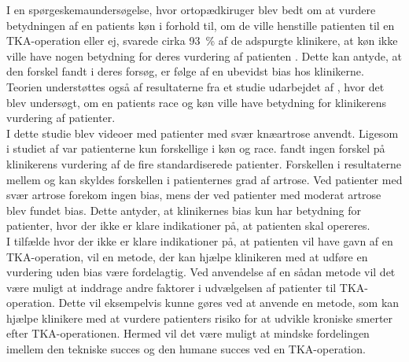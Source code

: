 I en spørgeskemaundersøgelse, hvor ortopædkiruger blev bedt om at vurdere betydningen af en patients køn i forhold til, om de ville henstille patienten til en TKA-operation eller ej, svarede cirka 93~\% af de adspurgte klinikere, at køn ikke ville have nogen betydning for deres vurdering af patienten \citep{wright1995}. Dette kan antyde, at den forskel  fandt i deres forsøg, er følge af en ubevidst bias hos klinikerne. Teorien understøttes også af resultaterne fra et studie udarbejdet af , hvor det blev undersøgt, om en patients race og køn ville have betydning for klinikerens vurdering af patienter.\\
I dette studie blev videoer med patienter med svær knæartrose anvendt. Ligesom i studiet af  var patienterne kun forskellige i køn og race.  fandt ingen forskel på klinikerens vurdering af de fire standardiserede patienter. Forskellen i resultaterne mellem  og  kan skyldes forskellen i patienternes grad af artrose. Ved patienter med svær artrose forekom ingen bias, mens der ved patienter med moderat artrose blev fundet bias. Dette antyder, at klinikernes bias kun har betydning for patienter, hvor der ikke er klare indikationer på, at patienten skal opereres.\\
I tilfælde hvor der ikke er klare indikationer på, at patienten vil have gavn af en TKA-operation, vil en metode, der kan hjælpe klinikeren med at udføre en vurdering uden bias være fordelagtig. Ved anvendelse af en sådan metode vil det være muligt at inddrage andre faktorer i udvælgelsen af patienter til TKA-operation. Dette vil eksempelvis kunne gøres ved at anvende en metode, som kan hjælpe klinikere med at vurdere patienters risiko for at udvikle kroniske smerter efter TKA-operationen. Hermed vil det være muligt at mindske fordelingen imellem den tekniske succes og den humane succes ved en TKA-operation.

